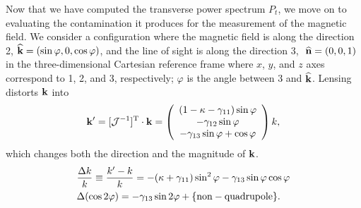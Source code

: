 Now that we have computed the transverse power spectrum $P_t$, we move on to evaluating the contamination it produces for the measurement of the magnetic field. We consider a configuration where the magnetic field is along the direction 2, ${\bf{\widehat k}}=(\sin\varphi,0,\cos\varphi)$, and the line of sight is along the direction 3, $\ {\bf{\widehat n}}=(0,0,1)$ in the three-dimensional Cartesian reference frame where $x$, $y$, and $z$ axes correspond to 1, 2, and 3, respectively; $\varphi$ is the angle between 3 and ${\bf{\widehat k}}$. Lensing distorts ${\bf{k}}$ into
\begin{equation}
{\bf{k}}'=[\mathcal{J}^{-1}]^{\rm T}\cdot{\bf{k}}=\left(\begin{array}{c}
(1-\kappa-\gamma_{11})\sin\varphi\\
-\gamma_{12}\sin\varphi\\
-\gamma_{13}\sin\varphi+\cos\varphi
\end{array}\right)k,
\label{eq:distorted_kn}
\end{equation}
which changes both the direction and the magnitude of ${\bf{k}}$.
\begin{align}
&\frac{\Delta k}{k}\equiv \frac{k'-k}{k}=-(\kappa+\gamma_{11})\sin^2\varphi-\gamma_{13}\sin\varphi\cos\varphi\nonumber\\
&\Delta(\cos 2\varphi)=-\gamma_{13}\sin 2\varphi+\lbrace{\rm non-quadrupole}\rbrace.
\end{align}

